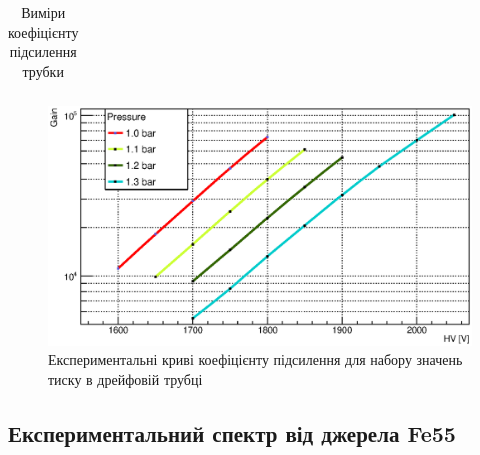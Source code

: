 \documentclass[pdftex,14pt]{scrartcl}
\begin{document}
\begin{table}[!h]
\begin{tabular}{|l|l|l|l|l|l|l|}
	\end{tabular}
	\caption{Виміри коефіцієнту підсилення трубки}
	\label{table:GainTotal}
	\end{table}
	
	\begin{figure}[!h]
	\centering
	\includegraphics[width=1.0\textwidth]{gain_multyGraph}
	\caption{ Експериментальні криві коефіцієнту підсилення для набору значень тиску в дрейфовій трубці}
	\label{fig:Gain_multy}
	\end{figure}
		
	
	\subsection{ Експериментальний спектр від джерела Fe55}
		
	
	
	
\end{document}
